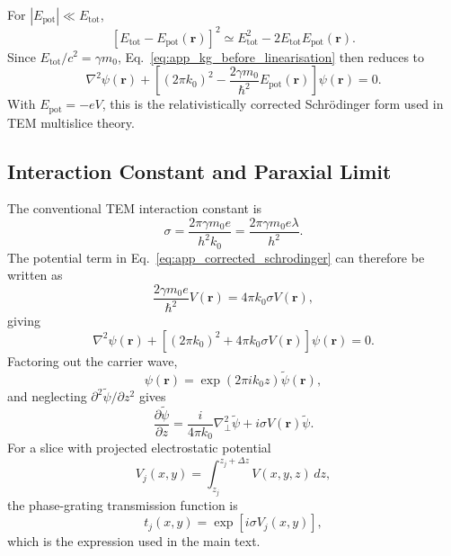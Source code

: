 For $|E_{\mathrm{pot}}|\ll E_{\mathrm{tot}}$,
\begin{equation}
\left[E_{\mathrm{tot}}-E_{\mathrm{pot}}(\mathbf r)\right]^2
\simeq
E_{\mathrm{tot}}^2
-
2E_{\mathrm{tot}}E_{\mathrm{pot}}(\mathbf r).
\label{eq:app_linearised_energy}
\end{equation}
Since $E_{\mathrm{tot}}/c^2=\gamma m_0$, Eq.~\eqref{eq:app_kg_before_linearisation}
then reduces to
\begin{equation}
\nabla^2\psi(\mathbf r)
+
\left[
(2\pi k_0)^2
-
\frac{2\gamma m_0}{\hbar^2}E_{\mathrm{pot}}(\mathbf r)
\right]\psi(\mathbf r)
=0.
\label{eq:app_corrected_schrodinger}
\end{equation}
With $E_{\mathrm{pot}}=-eV$, this is the relativistically corrected
Schr\"odinger form used in TEM multislice theory.

\subsection{Interaction Constant and Paraxial Limit}

The conventional TEM interaction constant is
\begin{equation}
\sigma
=
\frac{2\pi\gamma m_0e}{h^2k_0}
=
\frac{2\pi\gamma m_0e\lambda}{h^2}.
\label{eq:app_sigma_definition}
\end{equation}
The potential term in Eq.~\eqref{eq:app_corrected_schrodinger} can therefore be
written as
\begin{equation}
\frac{2\gamma m_0e}{\hbar^2}V(\mathbf r)
=
4\pi k_0\sigma V(\mathbf r),
\label{eq:app_potential_term_sigma}
\end{equation}
giving
\begin{equation}
\nabla^2\psi(\mathbf r)
+
\left[
(2\pi k_0)^2
+
4\pi k_0\sigma V(\mathbf r)
\right]\psi(\mathbf r)
=0.
\label{eq:app_corrected_schrodinger_sigma}
\end{equation}
Factoring out the carrier wave,
\begin{equation}
\psi(\mathbf r)
=
\exp(2\pi i k_0z)\tilde\psi(\mathbf r),
\label{eq:app_carrier_wave}
\end{equation}
and neglecting $\partial^2\tilde\psi/\partial z^2$ gives
\begin{equation}
\frac{\partial\tilde\psi}{\partial z}
=
\frac{i}{4\pi k_0}\nabla_\perp^2\tilde\psi
+
i\sigma V(\mathbf r)\tilde\psi.
\label{eq:app_paraxial_sigma}
\end{equation}
For a slice with projected electrostatic potential
\begin{equation}
V_j(x,y)
=
\int_{z_j}^{z_j+\Delta z}V(x,y,z)\,dz,
\label{eq:app_projected_potential}
\end{equation}
the phase-grating transmission function is
\begin{equation}
t_j(x,y)
=
\exp\left[i\sigma V_j(x,y)\right],
\label{eq:app_transmission_function}
\end{equation}
which is the expression used in the main text.
